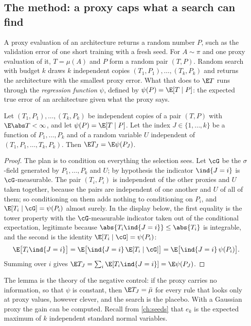 \begin{refsection}
\section{The method: a proxy caps what a search can find}\label{sec:controls:proxy}

A proxy evaluation of an architecture returns a random number $P$, such as the validation error of one short training with a fresh seed. For $A\sim\pi$ and one proxy evaluation of it, $T=\mu(A)$ and $P$ form a random pair $(T,P)$. Random search with budget $k$ draws $k$ independent copies $(T_1,P_1),\dots,(T_k,P_k)$ and returns the architecture with the smallest proxy error. What that does to $\E T$ runs through the \emph{regression function} $\psi$, defined by $\psi(P)=\E[T\mid P]$: the expected true error of an architecture given what the proxy says.

\begin{lemma}\label{lem:controls:regression}
Let $(T_1,P_1),\dots,(T_k,P_k)$ be independent copies of a pair $(T,P)$ with $\E\abs T<\infty$, and let $\psi(P)=\E[T\mid P]$. Let the index $J\in\{1,\dots,k\}$ be a function of $P_1,\dots,P_k$ and of a random variable $U$ independent of $(T_1,P_1,\dots,T_k,P_k)$. Then $\E T_J=\E\psi(P_J)$.
\end{lemma}

\begin{proof}
The plan is to condition on everything the selection sees. Let $\cG$ be the $\sigma$-field generated by $P_1,\dots,P_k$ and $U$; by hypothesis the indicator $\ind\{J=i\}$ is $\cG$-measurable. The pair $(T_i,P_i)$ is independent of the other proxies and $U$ taken together, because the pairs are independent of one another and $U$ of all of them; so conditioning on them adds nothing to conditioning on $P_i$, and $\E[T_i\mid\cG]=\psi(P_i)$ almost surely. In the display below, the first equality is the tower property with the $\cG$-measurable indicator taken out of the conditional expectation, legitimate because $\abs{T_i\ind\{J=i\}}\le\abs{T_i}$ is integrable, and the second is the identity $\E[T_i\mid\cG]=\psi(P_i)$:
\[
  \E\bigl[T_i\ind\{J=i\}\bigr]=\E\bigl[\ind\{J=i\}\,\E[T_i\mid\cG]\bigr]=\E\bigl[\ind\{J=i\}\,\psi(P_i)\bigr].
\]
Summing over $i$ gives $\E T_J=\sum_i\E[T_i\ind\{J=i\}]=\E\psi(P_J)$.
\end{proof}

The lemma is the theory of the negative control: if the proxy carries no information, so that $\psi$ is constant, then $\E T_J=\bar\mu$ for every rule that looks only at proxy values, however clever, and the search is the placebo. With a Gaussian proxy the gain can be computed. Recall from \cref{ch:seeds} that $e_k$ is the expected maximum of $k$ independent standard normal variables.


\end{refsection}
